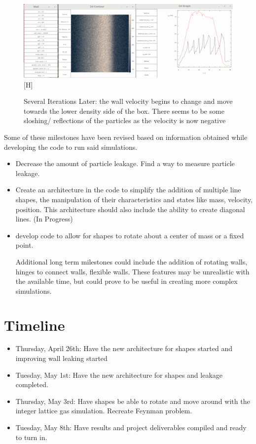 \documentclass{article}
\begin{document}
\begin{itemize}
\begin{figure}

\includegraphics[scale=0.2]{ms2p1.png}[H]
\caption{\label{fig} Several Iterations Later: the wall velocity begins to change and move towards the lower density side of the box. There seems to be some sloshing/ reflections of the particles as the velocity is now negative}
\end{figure} 

  
\end{itemize}
Some of these milestones have been revised based on information obtained while developing the code to run said simulations. 
\begin{itemize}
  
  \item Decrease the amount of particle leakage. Find a way to measure particle leakage.
  
  \item Create an architecture in the code to simplify the addition of multiple line shapes, the manipulation of their characteristics and states like mass, velocity, position. This architecture should also include the ability to create diagonal lines. (In Progress)
  
  \item develop code to allow for shapes to rotate about a center of mass or a fixed point.
  
 
Additional long term milestones could include the addition of rotating walls, hinges to connect walls, flexible walls. These features may be unrealistic with the available time, but could prove to be useful in creating more complex simulations.
\end{itemize}
\section{Timeline}
\begin{itemize}

  \item Thursday, April 26th: Have the new architecture for shapes started and improving wall leaking started
  \item Tuesday, May 1st: Have the new architecture for shapes and leakage completed.
  \item Thursday, May 3rd: Have shapes be able to rotate and move around with the integer lattice gas simulation. Recreate Feynman problem.
  \item Tuesday, May 8th: Have results and project deliverables compiled and ready to turn in.
\end{itemize}
\end{document}
